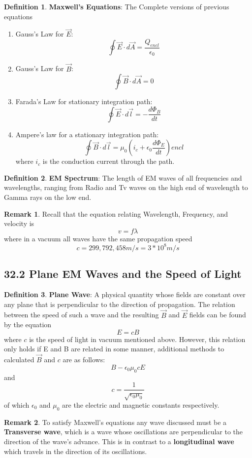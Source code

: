 \documentclass[12pt]{amsart}
\theoremstyle{definition}
\newtheorem{definition}{Definition} %
\newtheorem*{remark}{Remark}        %
\numberwithin{equation}{theorem}    %
\begin{document}
\begin{definition}
    \textbf{Maxwell's Equations}:
    The Complete versions of previous equations
    \begin{enumerate}
        \item Gauss's Law for $\vec{E}$: $$\oint \vec{E} \cdot d\vec{A} = \frac{Q_{encl}}{\epsilon_0}$$ 
        \item Gauss's Law for $\vec{B}$: $$\oint \vec{B} \cdot d\vec{A} = 0$$
        \item Farada's Law for stationary integration path:$$\oint \vec{E} \cdot d\vec{l} = -\frac{d\Phi_B}{dt}$$  
        \item Ampere’s law for a stationary integration path:
        $$\oint \vec{B} \cdot d\vec{l} = \mu_0 (i_c + \epsilon_0\frac{d\Phi_E}{dt})encl$$ where $i_c$ is the conduction current through the path.
    \end{enumerate}
\end{definition}

\begin{definition}
    \textbf{EM Spectrum}:
    The length of EM waves of all frequencies and wavelengths, ranging from Radio and Tv waves on the high end of wavelength to Gamma rays on the low end.
    \begin{remark}
        Recall that the equation relating Wavelength, Frequency, and velocity is $$v = f\lambda$$ where in a vacuum all waves have the same propagation speed $$c = 299,792,458 m/s = 3*10^8 m/s$$
    \end{remark}
\end{definition}

\subsection*{32.2 Plane EM Waves and the Speed of Light}



\begin{definition}
    \textbf{Plane Wave}:
    A physical quantity whose fields are constant over any plane that is perpendicular to the direction of propagation. The relation between the speed of such a wave and the resulting $\vec{B}$ and $\vec{E}$ fields can be found by the equation 
    $$E = cB$$ where $c$ is the speed of light in vacuum mentioned above.
    However, this relation only holds if E and B are related in some manner, additional methods to calculated $\vec{B}$ and $c$ are as follows:
    $$B - \epsilon_0\mu_0cE$$ and $$c = \frac{1}{\sqrt{\epsilon_0\mu_0}}$$
    of which $\epsilon_0$ and $\mu_0$ are the electric and magnetic constants respectively.
    \begin{remark}
        To satisfy Maxwell's equations any wave discussed must be a \textbf{Transverse wave}, which is a wave whose oscillations are perpendicular to the direction of the wave's advance. This is in contrast to a \textbf{longitudinal wave} which travels in the direction of its oscillations.
    \end{remark}
\end{definition}
\end{document}
